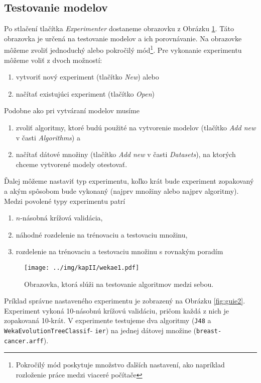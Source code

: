 \pagebreak

\subsection*{Testovanie modelov}
Po stlačení tlačítka \emph{Experimenter} dostaneme obrazovku z Obrázku \ref{fig:guie1}. Táto obrazovka je určená na testovanie modelov a ich porovnávanie. Na obrazovke môžeme zvoliť jednoduchý alebo pokročilý mód\footnote{Pokročilý mód poskytuje množstvo ďalších nastavení, ako napríklad rozloženie práce medzi viaceré počítače}. 
Pre vykonanie experimentu môžeme voliť z dvoch možností:
\begin{enumerate}
\item vytvoriť nový experiment (tlačítko \emph{New}) alebo
\item načítať existujúci experiment (tlačítko \emph{Open})
\end{enumerate} 

Podobne ako pri vytváraní modelov musíme
\begin{enumerate}
\item zvoliť algoritmy, ktoré budú použité na vytvorenie modelov (tlačítko \emph{Add new} v časti \emph{Algorithms}) a
\item načítať dátové množiny (tlačítko \emph{Add new} v časti \emph{Datasets}), na ktorých chceme vytvorené modely otestovať.
\end{enumerate}

Ďalej môžeme nastaviť typ experimentu, koľko krát bude experiment zopakovaný a akým spôsobom bude vykonaný (najprv množiny alebo najprv algoritmy). Medzi povolené typy experimentu patrí
\begin{enumerate}
\item $n$-násobná krížová validácia,
\item náhodné rozdelenie na trénovaciu a testovaciu množinu,
\item rozdelenie na trénovaciu a testovaciu množinu s rovnakým poradím
\end{enumerate}

\begin{figure}[h!]
\centering
\centerline{\mbox{\texttt{[image: ../img/kapII/wekae1.pdf]}}}
\caption{Obrazovka, ktorá slúži na testovanie algoritmov medzi sebou.}\label{fig:guie1}
\end{figure}

Príklad správne nastaveného experimentu je zobrazený na Obrázku \ref{fig:guie2}. Experiment vykoná 10-násobnú krížovú validáciu, pričom každá z nich je zopakovaná 10-krát. V experimente testujeme dva algoritmy (\verb|J48| a \verb|WekaEvolutionTreeClassif|- \verb|ier|) na jednej dátovej množine (\verb|breast-cancer.arff|).

